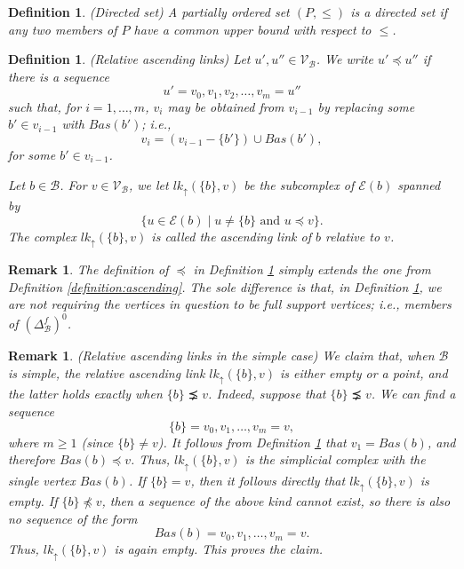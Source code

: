 \documentclass{amsart}
\newtheorem{Definition}[theorem]{Definition}
\newtheorem{Remark}[theorem]{Remark}
\newtheorem{standing assumption}[theorem]{Standing Assumption}
\newenvironment{definition}{\begin{Definition}\normalfont}{\end{Definition}}
\newenvironment{remark}{\begin{Remark}\normalfont}{\end{Remark}}
\begin{document}
\begin{definition} (Directed set) \label{definition:directed}
A partially ordered set $(P,\leq)$ is a \emph{directed set}
if any two members of $P$ have a common upper bound with respect to $\leq$.
\end{definition}

\begin{definition} (Relative ascending links) \label{definition:relative}
Let $u', u'' \in \mathcal{V}_{\mathcal{B}}$. We write 
$u' \preceq u''$ if there is a sequence 
\[ u' = v_{0}, v_{1}, v_{2}, \ldots, v_{m} = u'' \]
such that, for $i=1, \ldots, m$, $v_{i}$ may be obtained from $v_{i-1}$ by replacing some
$b' \in v_{i-1}$ with $Bas(b')$; i.e., 
\[ v_{i} = \left( v_{i-1} - \{ b' \} \right) \cup Bas(b'), \]
for some $b' \in v_{i-1}$. 

Let $b \in \mathcal{B}$. For $v \in \mathcal{V}_{\mathcal{B}}$, we let
 $lk_{\uparrow}(\{ b \}, v)$ be the subcomplex of $\mathcal{E}(b)$ spanned
 by
 \[ \{ u \in \mathcal{E}(b) \mid u \neq \{ b \} \text { and }
u \preceq v \}. \]
The complex $lk_{\uparrow}(\{ b \}, v)$ is called the \emph{ascending link of $b$ relative to $v$}.
\end{definition}

\begin{remark} \label{remark:defremark}
The definition of $\preceq$ in Definition \ref{definition:relative}
simply extends the one from Definition \ref{definition:ascending}. The sole difference is that, in Definition \ref{definition:relative}, we are not requiring the vertices in question to be \emph{full support} vertices; i.e., members of $\left(\Delta^{f}_{\mathcal{B}}\right)^{0}$.
\end{remark}

\begin{remark} \label{remark:ascending}
(Relative ascending links in the simple case)
We claim that, when $\mathcal{B}$ is simple, the relative ascending link
$lk_{\uparrow}(\{ b \}, v)$ is either empty or a point, and the latter holds exactly when
$\{ b \} \precneq v$. Indeed, suppose that $\{ b \} \precneq v$. We can find a sequence
\[ \{ b \} = v_{0}, v_{1}, \ldots, v_{m} = v, \]
where $m \geq 1$ (since $\{ b \} \neq v$). It follows from Definition \ref{definition:relative} that $v_{1} = Bas(b)$, and therefore $Bas(b) \preceq v$. Thus,
$lk_{\uparrow}(\{ b \}, v)$ is the simplicial complex with the single vertex $Bas(b)$.
If $\{ b \} = v$, then it follows directly that $lk_{\uparrow}(\{ b \}, v)$ is empty. 
If $\{ b \} \not \preceq v$, then a sequence of the above kind cannot exist, so there is also 
no sequence of the form
\[ Bas(b) = v_{0}, v_{1}, \ldots, v_{m} = v. \]
Thus, $lk_{\uparrow}(\{ b \}, v)$ is again empty. This proves the claim.
\end{remark}
\end{document}
